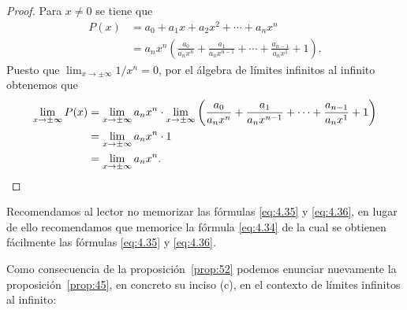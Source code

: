 \documentclass[12pt,a4paper]{book}
\begin{document}
    \begin{proof}
        Para $x\neq 0$ se tiene que
        \begin{align*}
            P(x)&=a_{0}+a_{1}x+a_{2}x^{2}+\cdots+a_{n}x^{n}\\
            &=a_{n}x^{n}\left(\frac{a_{0}}{a_{n}x^{n}}+\frac{a_{1}}{a_{n}x^{n-1}}+\cdots+\frac{a_{n-1}}{a_{n}x^{1}}+1\right).
        \end{align*}
        Puesto que $\lim_{x\to\pm\infty}1/x^{n}=0$, por el álgebra de límites infinitos al infinito
        obtenemos que
        \begin{align*}
            \lim_{x\to\pm\infty}P(x)&=\lim_{x\to\pm\infty}a_{n}x^{n}\cdot\lim_{x\to\pm\infty}\left(\frac{a_{0}}{a_{n}x^{n}}+\frac{a_{1}}{a_{n}x^{n-1}}+\cdots+\frac{a_{n-1}}{a_{n}x^{1}}+1\right)\\
            &=\lim_{x\to\pm\infty}a_{n}x^{n}\cdot 1\\
            &=\lim_{x\to\pm\infty}a_{n}x^{n}.\qedhere
        \end{align*}
    \end{proof}

    Recomendamos al lector no memorizar las fórmulas \eqref{eq:4.35} y \eqref{eq:4.36}, en
    lugar de ello recomendamos que memorice la fórmula \eqref{eq:4.34} de la cual se
    obtienen fácilmente las fórmulas \eqref{eq:4.35} y \eqref{eq:4.36}.

    Como consecuencia de la proposición~\ref{prop:52} podemos enunciar nuevamente la
    proposición~\ref{prop:45}, en concreto su inciso (c), en el contexto de límites infinitos
    al infinito:
\end{document}
